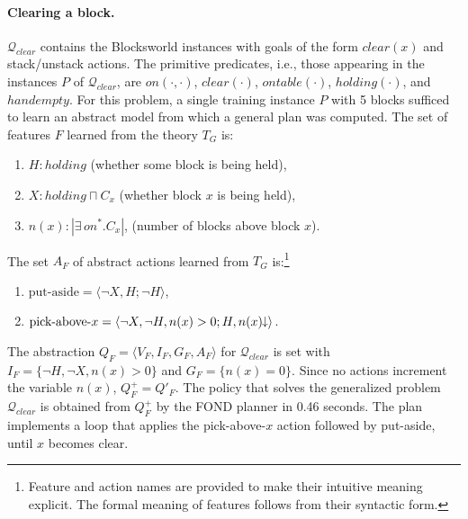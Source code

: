 \documentclass[letterpaper]{article} %
\newcommand{\tup}[1]{\langle #1 \rangle}
\newcommand{\abs}[1]{\ensuremath{\left\vert{#1}\right\vert}}
\newcommand{\Q}{\mathcal{Q}}
\newcommand{\abst}[2]{\tup{#1;#2}}
\newcommand{\mminus}{\hspace{-.05em}\raisebox{.15ex}{\footnotesize$\downarrow$}}
\begin{document}
\paragraph{Clearing a block.}
$\Q_{clear}$ contains the Blocksworld instances  with goals of the form  $clear(x)$
and stack/unstack actions. The primitive predicates, i.e., those appearing in the  instances $P$ of $\Q_{clear}$, 
are $on(\cdot,\cdot)$, $clear(\cdot)$, $ontable(\cdot)$, $holding(\cdot)$, and $handempty$. 
For this problem, a  single training instance $P$  with  5 blocks sufficed to learn an abstract model from
which a general plan was computed. The  set of  features $F$ learned  from the theory $T_G$ is:

\begin{enumerate}[--]
  \item $H: holding$ (whether some block is being held),
  \item $X: holding \sqcap C_x$ (whether block $x$ is being held),
  \item $n(x): \abs{\exists\,on^* . C_x}$, (number of blocks above block $x$).
\end{enumerate}

\noindent The set $A_F$  of abstract actions learned  from $T_G$ is:\footnote{
Feature and action names are provided   to make their intuitive meaning explicit.
The formal meaning of features  follows from their syntactic form.}

\begin{enumerate}[--]
  \item $\text{put-aside} = \abst{\neg X, H}{\neg H}$,
  \item $\text{pick-above-$x$} = \abst{\neg X, \neg H, n(x) > 0}{H, n(x)\mminus}$.
\end{enumerate}

The  abstraction $Q_F=\tup{V_F,I_F,G_F,A_F}$ for $\Q_{clear}$ is set with 
$I_F = \{\neg H, \neg X, n(x) > 0\}$ and $G_F=\{n(x)=0\}$.
Since no actions increment the variable $n(x)$, 
$Q^+_F=Q'_F$. The policy that solves the generalized problem $\Q_{clear}$
is obtained from $Q^+_F$ by the FOND planner in 0.46 seconds. The plan implements
a loop that applies the pick-above-$x$ action followed by put-aside,
until $x$ becomes clear. 


% 
\end{document}
